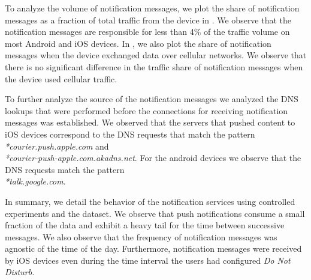 To analyze the volume of notification messages, we plot the share of notification messages as a fraction of total traffic from the device in .
We observe that the notification messages are responsible for less than 4\% of the traffic volume on most Android and iOS devices. 
In , we also plot the share of notification messages when the device exchanged data over cellular networks. 
We observe that there is no significant difference in the traffic share of notification messages when the device used cellular traffic. 

To further analyze the source of the notification messages we analyzed the DNS lookups that were performed before the connections for receiving notification messages was established. 
We observed that the servers that pushed content to iOS devices correspond to the DNS requests that match the pattern \emph{*courier.push.apple.com} and \\ \emph{*courier-push-apple.com.akadns.net}.
For the android devices we observe that the DNS requests match the pattern\\ \emph{*talk.google.com}. 

In summary, we detail the behavior of the notification services using controlled experiments and the \mobWild dataset.  
We observe that push notifications consume a small fraction of the data and exhibit a heavy tail for the time between successive messages. 
We also observe that the frequency of notification messages was agnostic of the time of the day. 
Furthermore, notification messages were received by iOS devices even during the time interval the users had configured \emph{Do Not Disturb.}







